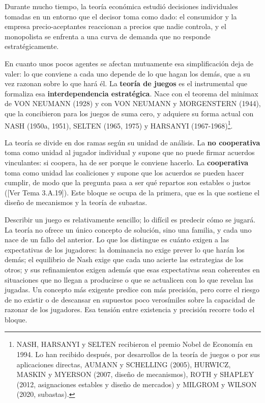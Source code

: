 \documentclass[10pt,a4paper]{article}
\newcommand{\authorfont}[1]{{\fontfamily{EBGaramond-TLF}\selectfont #1}}
\begin{document}
Durante mucho tiempo, la teoría económica estudió decisiones individuales tomadas en un entorno que el decisor toma como dado: el consumidor y la empresa precio-aceptantes reaccionan a precios que nadie controla, y el monopolista se enfrenta a una curva de demanda que no responde estratégicamente. 

En cuanto unos pocos agentes se afectan mutuamente esa simplificación deja de valer: lo que conviene a cada uno depende de lo que hagan los demás, que a su vez razonan sobre lo que hará él. La \textbf{teoría de juegos} es el instrumental que formaliza esa \textbf{interdependencia estratégica}. Nace con el teorema del minimax de VON NEUMANN (1928) y con VON NEUMANN y MORGENSTERN (1944), que la concibieron para los juegos de suma cero, y adquiere su forma actual con NASH (1950a, 1951), SELTEN (1965, 1975) y HARSANYI (1967-1968)\footnote{%
  NASH, HARSANYI y SELTEN recibieron el premio Nobel de Economía en 1994. Lo han recibido después, por desarrollos de la teoría de juegos o por sus aplicaciones directas, AUMANN y SCHELLING (2005), HURWICZ, MASKIN y MYERSON (2007, diseño de mecanismos), ROTH y SHAPLEY (2012, asignaciones estables y diseño de mercados) y MILGROM y WILSON (2020, subastas).
}.

La teoría se divide en dos ramas según su unidad de análisis. La \textbf{no cooperativa} toma como unidad al jugador individual y supone que no puede firmar acuerdos vinculantes: si coopera, ha de ser porque le conviene hacerlo. La \textbf{cooperativa} toma como unidad las coaliciones y supone que los acuerdos se pueden hacer cumplir, de modo que la pregunta pasa a ser qué repartos son estables o justos ([\authorfont{Ver Tema 3.A.19}]). Este bloque se ocupa de la primera, que es la que sostiene el diseño de mecanismos y la teoría de subastas.

Describir un juego es relativamente sencillo; lo difícil es predecir cómo se jugará. La teoría no ofrece un único concepto de solución, sino una familia, y cada uno nace de un fallo del anterior. Lo que los distingue es cuánto exigen a las expectativas de los jugadores: la dominancia no exige prever lo que harán los demás; el equilibrio de Nash exige que cada uno acierte las estrategias de los otros; y sus refinamientos exigen además que esas expectativas sean coherentes en situaciones que no llegan a producirse o que se actualicen con lo que revelan las jugadas. Un concepto más exigente predice con más precisión, pero corre el riesgo de no existir o de descansar en supuestos poco verosímiles sobre la capacidad de razonar de los jugadores. Esa tensión entre existencia y precisión recorre todo el bloque.
\end{document}
